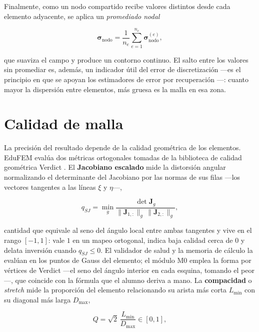 Finalmente, como un nodo compartido recibe valores distintos desde cada elemento adyacente, se aplica un \emph{promediado nodal}

\begin{equation}
\bm{\sigma}_{\text{nodo}} = \frac{1}{n_e}\sum_{e=1}^{n_e} \bm{\sigma}_{\text{nodo}}^{(e)},
\label{eq:promediado}
\end{equation}

que suaviza el campo y produce un contorno continuo. El salto entre los valores sin promediar es, además, un indicador útil del error de discretización —es el principio en que se apoyan los estimadores de error por recuperación \autocite[pp.~476-477]{zienkiewicz2013fem}—: cuanto mayor la dispersión entre elementos, más gruesa es la malla en esa zona.

\section{Calidad de malla}
\label{sec:calidad-malla}

La precisión del resultado depende de la calidad geométrica de los elementos. EduFEM evalúa dos métricas ortogonales tomadas de la biblioteca de calidad geométrica Verdict \autocite{stimpson2007verdict}. El \textbf{Jacobiano escalado} mide la distorsión angular normalizando el determinante del Jacobiano por las normas de sus filas —los vectores tangentes a las líneas $\xi$ y $\eta$—,

\begin{equation}
q_{SJ} = \min_g \frac{\det\bm{J}_g}{\|\bm{J}_{1,:}\|_g\,\|\bm{J}_{2,:}\|_g},
\label{eq:scaled-jacobian}
\end{equation}

cantidad que equivale al seno del ángulo local entre ambas tangentes y vive en el rango $[-1, 1]$: vale $1$ en un mapeo ortogonal, indica baja calidad cerca de $0$ y delata inversión cuando $q_{SJ} \le 0$. El validador de salud y la memoria de cálculo la evalúan en los puntos de Gauss del elemento; el módulo M0 emplea la forma por vértices de Verdict —el seno del ángulo interior en cada esquina, tomando el peor—, que coincide con la fórmula que el alumno deriva a mano. La \textbf{compacidad} o \emph{stretch} mide la proporción del elemento relacionando su arista más corta $L_{\min}$ con su diagonal más larga $D_{\max}$,

\begin{equation}
Q = \sqrt{2}\,\frac{L_{\min}}{D_{\max}} \in [0, 1],
\label{eq:stretch}
\end{equation}


